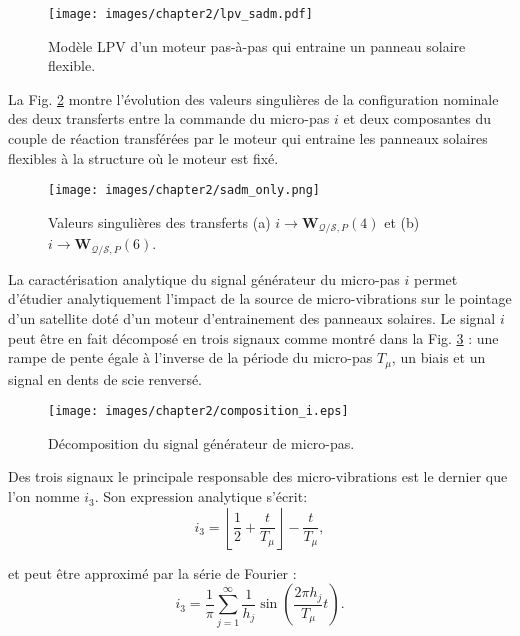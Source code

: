 \vspace{-10pt}
\begin{figure}[!ht]
\centering
\texttt{[image: images/chapter2/lpv\_sadm.pdf]} %
\caption{Modèle LPV d'un moteur pas-à-pas qui entraine un panneau solaire flexible.} 
\label{fig:lpv_sadm_fr}
\end{figure}
\vspace{-10pt}

La Fig. \ref{fig:sadm_only_fr} montre l’évolution des valeurs singulières de la configuration nominale des deux transferts entre la commande du micro-pas $i$ et deux composantes du couple de réaction transférées par le moteur qui entraine les panneaux solaires flexibles à la structure où le moteur est fixé.

\begin{figure}[!ht]
\centering
\texttt{[image: images/chapter2/sadm\_only.png]} %
\caption{Valeurs singulières des transferts (a) $i\rightarrow \mathbf{W}_{\mathcal{Q}/\mathcal{S},P}(4)$ et (b) $i\rightarrow \mathbf{W}_{\mathcal{Q}/\mathcal{S},P}(6)$.} 
\label{fig:sadm_only_fr}
\end{figure}

La caractérisation analytique du signal générateur du micro-pas $i$ permet d’étudier analytiquement l’impact de la source de micro-vibrations sur le pointage d’un satellite doté d’un moteur d’entrainement des panneaux solaires. Le signal $i$ peut être en fait décomposé en trois signaux comme montré dans la Fig. \ref{fig:composition_i_fr} : une rampe de pente égale à l’inverse de la période du micro-pas $T_{\mu}$, un biais et  un signal en dents de scie renversé. 

\begin{figure}[!ht]
\centering
\texttt{[image: images/chapter2/composition\_i.eps]} %
\caption{Décomposition du signal générateur de micro-pas.} 
\label{fig:composition_i_fr}
\end{figure}

Des trois signaux le principale responsable des micro-vibrations est le dernier que l'on nomme $i_3$. Son expression analytique s'écrit:
\begin{equation}
i_3 = \left\lfloor\frac{1}{2}+\frac{t}{T_\mu}\right\rfloor-\frac{t}{T_\mu},
\label{eq:sawtooth_fr}
\end{equation}

et peut être approximé par la série de Fourier :
\begin{equation}
i_3 = \frac{1}{\pi}\sum_{j=1}^{\infty} \frac{1}{h_j}\sin\left(\frac{2\pi h_j}{T_\mu}t\right).
\label{eq:sadm_harmonics_fr}
\end{equation}

